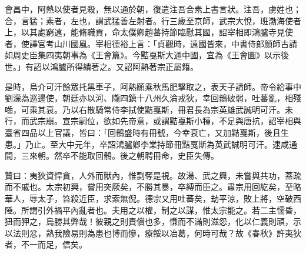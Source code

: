 \begin{pinyinscope}
 會昌中，阿熱以使者見殺，無以通於朝，復遣注吾合素上書言狀。注吾，虜姓也；合，言猛；素者，左也，謂武猛善左射者。行三歲至京師，武宗大悅，班渤海使者上，以其處窮遠，能脩職貢，命太僕卿趙蕃持節臨慰其國，詔宰相即鴻臚寺見使者，使譯官考山川國風。宰相德裕上言：「貞觀時，遠國皆來，中書侍郎顏師古請如周史臣集四夷朝事為《王會篇》。今黠戛斯大通中國，宜為《王會圖》以示後世。」有詔以鴻臚所得繢著之。又詔阿熱著宗正屬籍。



 是時，烏介可汗餘眾托黑車子，阿熱願乘秋馬肥擊取之，表天子請師。帝令給事中劉濛為巡邊使，朝廷亦以河、隴四鎮十八州久淪戎狄，幸回鶻破弱，吐蕃亂，相殘嚙，可乘其衰。乃以右散騎常侍李拭使黠戛斯，冊君長為宗英雄武誠明可汗。未行，而武宗崩。宣宗嗣位，欲如先帝意，或謂黠戛斯小種，不足與唐抗，詔宰相與臺省四品以上官議，皆曰：「回鶻盛時有冊號，今幸衰亡，又加黠戛斯，後且生患。」乃止。至大中元年，卒詔鴻臚卿李業持節冊黠戛斯為英武誠明可汗。逮咸通間，三來朝。然卒不能取回鶻。後之朝聘冊命，史臣失傳。



 贊曰：夷狄資悍貪，人外而獸內，惟剽奪是視。故湯、武之興，未嘗與共功，蓋疏而不戚也。太宗初興，嘗用突厥矣，不勝其暴，卒縛而臣之。肅宗用回紇矣，至略華人，辱太子，笞殺近臣，求索無倪。德宗又用吐蕃矣，劫平涼，敗上將，空破西陲。所謂引外禍平內亂者也。夫用之以權，制之以謀，惟太宗能之。若二主懦昏，狃而狎之，烏勝其弊哉！彼親之則責償也多，慊而不滿則滋怨，化以仁義則頑，示以法則忿，熟我險易則為患也博而慘，療餒以冶葛，何時可哉？故《春秋》許夷狄者，不一而足，信矣。



\end{pinyinscope}